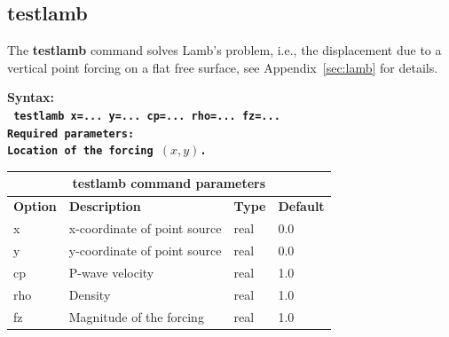 \documentclass[11pt]{report}
\begin{document}
\subsection{testlamb}
\label{keyword:testlamb}
The {\bf testlamb} command solves Lamb's problem, i.e., the displacement due to a vertical point
forcing on a flat free surface, see Appendix~\ref{sec:lamb} for details. 
\begin{flushleft}
\bf
Syntax:\\
\tt
testlamb x=... y=... cp=... rho=... fz=...
\\
\bf Required parameters:\\
\rm Location of the forcing $(x, y)$.
\end{flushleft}
%
\begin{center}
\begin{tabular}{|l|p{8cm}|l|l|} \hline
\multicolumn{4}{|c|}{\bf testlamb command  parameters}\\ \hline
\bf{Option} & \bf{Description} & \bf{Type} & \bf{Default} \\ \hline \hline
x    & x-coordinate of point source & real & 0.0 \\ \hline
y    & y-coordinate of point source & real & 0.0 \\ \hline
cp   & P-wave velocity              & real & 1.0 \\ \hline
rho  & Density                      & real & 1.0 \\ \hline
fz   & Magnitude of the forcing     & real & 1.0 \\ \hline
\end{tabular}
\end{center}

\end{document}
